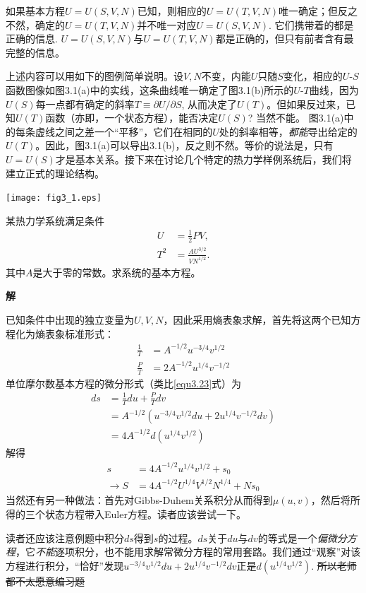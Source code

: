 如果基本方程$U = U(S, V, N)$已知，则相应的$U = U(T, V, N)$唯一确定；但反之不然，确定的$U = U(T, V, N)$并不唯一对应$U = U(S, V, N)$. 它们携带着的都是正确的信息. $U = U(S, V, N)$与$U = U(T, V, N)$都是正确的，但只有前者含有最完整的信息。  

上述内容可以用如下的图例简单说明。设$V, N$不变，内能$U$只随$S$变化，相应的$U\text{-}S$函数图像如图3.1(a)中的实线，这条曲线唯一确定了图3.1(b)所示的$U\text{-}T$曲线，因为$U(S)$每一点都有确定的斜率$T \equiv \partial U / \partial S$, 从而决定了$U(T)$。但如果反过来，已知$U(T)$函数（亦即，一个状态方程），能否决定$U(S)$? 当然不能。 图3.1(a)中的每条虚线之间之差一个“平移”，它们在相同的$U$处的斜率相等，{\it 都能}导出给定的$U(T)$。因此，图3.1(a)可以导出3.1(b)，反之则不然。等价的说法是，只有$U = U(S)$才是基本关系。接下来在讨论几个特定的热力学样例系统后，我们将建立正式的理论结构。

{
	\texttt{[image: fig3\_1.eps]} 
	\figcaption{ }
}

\begin{example}

某热力学系统满足条件
\begin{align*}
    U &= \frac{1}{2} PV, \\
    T^2 &= \frac{AU^{3/2}}{VN^{1/2}}.
\end{align*}
其中$A$是大于零的常数。求系统的基本方程。

{\bf 解}

已知条件中出现的独立变量为$U, V, N$，因此采用熵表象求解，首先将这两个已知方程化为熵表象标准形式：
\begin{align*}
    \frac{1}{T} &= A^{-1/2} u^{-3/4} v^{1/2} \\
    \frac{P}{T} &= 2A^{-1/2} u^{1/4} v^{-1/2}
\end{align*}
单位摩尔数基本方程的微分形式（类比\eqref{equ3.23}式）为
\begin{align*}
    ds &= \frac{1}{T} du + \frac{P}{T} dv \\
    &= A^{-1/2} (u^{-3/4} v^{1/2} du + 2u^{1/4} v^{-1/2} dv) \\
    &= 4A^{-1/2} d(u^{1/4} v^{1/2})
\end{align*}
解得
\begin{align*}
    s &= 4A^{-1/2} u^{1/4} v^{1/2} + s_0 \\
    \to S &= 4A^{-1/2} U^{1/4} V^{1/2} N^{1/4} + Ns_0
\end{align*}
当然还有另一种做法：首先对Gibbs-Duhem关系积分从而得到$\mu (u, v)$，然后将所得的三个状态方程带入Euler方程。读者应该尝试一下。

读者还应该注意例题中积分$ds$得到$s$的过程。$ds$关于$du$与$dv$的等式是一个{\it 偏微分方程}，它{\it 不能}逐项积分，也不能用求解常微分方程的常用套路。我们通过“观察”对该方程进行积分，“恰好”发现$u^{-3/4} v^{1/2} du + 2u^{1/4} v^{-1/2} dv$正是$d(u^{1/4} v^{1/2})$. \sout{所以老师都不太愿意编习题}

\end{example}

